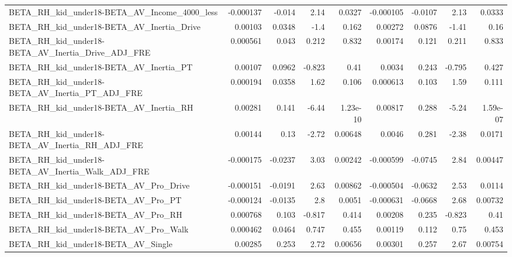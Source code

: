 \begin{tabular}{lrrrrrrrr}
BETA\_RH\_kid\_under18-BETA\_AV\_Income\_4000\_less       &   -0.000137 &       -0.014 &     2.14 &   0.0327 &  -0.000105 &     -0.0107 &         2.13 &        0.0333 \\
BETA\_RH\_kid\_under18-BETA\_AV\_Inertia\_Drive          &     0.00103 &       0.0348 &     -1.4 &    0.162 &    0.00272 &      0.0876 &        -1.41 &          0.16 \\
BETA\_RH\_kid\_under18-BETA\_AV\_Inertia\_Drive\_ADJ\_FRE  &    0.000561 &        0.043 &    0.212 &    0.832 &    0.00174 &       0.121 &        0.211 &         0.833 \\
BETA\_RH\_kid\_under18-BETA\_AV\_Inertia\_PT             &     0.00107 &       0.0962 &   -0.823 &     0.41 &     0.0034 &       0.243 &       -0.795 &         0.427 \\
BETA\_RH\_kid\_under18-BETA\_AV\_Inertia\_PT\_ADJ\_FRE     &    0.000194 &       0.0358 &     1.62 &    0.106 &   0.000613 &       0.103 &         1.59 &         0.111 \\
BETA\_RH\_kid\_under18-BETA\_AV\_Inertia\_RH             &     0.00281 &        0.141 &    -6.44 & 1.23e-10 &    0.00817 &       0.288 &        -5.24 &      1.59e-07 \\
BETA\_RH\_kid\_under18-BETA\_AV\_Inertia\_RH\_ADJ\_FRE     &     0.00144 &         0.13 &    -2.72 &  0.00648 &     0.0046 &       0.281 &        -2.38 &        0.0171 \\
BETA\_RH\_kid\_under18-BETA\_AV\_Inertia\_Walk\_ADJ\_FRE   &   -0.000175 &      -0.0237 &     3.03 &  0.00242 &  -0.000599 &     -0.0745 &         2.84 &       0.00447 \\
BETA\_RH\_kid\_under18-BETA\_AV\_Pro\_Drive              &   -0.000151 &      -0.0191 &     2.63 &  0.00862 &  -0.000504 &     -0.0632 &         2.53 &        0.0114 \\
BETA\_RH\_kid\_under18-BETA\_AV\_Pro\_PT                 &   -0.000124 &      -0.0135 &      2.8 &   0.0051 &  -0.000631 &     -0.0668 &         2.68 &       0.00732 \\
BETA\_RH\_kid\_under18-BETA\_AV\_Pro\_RH                 &    0.000768 &        0.103 &   -0.817 &    0.414 &    0.00208 &       0.235 &       -0.823 &          0.41 \\
BETA\_RH\_kid\_under18-BETA\_AV\_Pro\_Walk               &    0.000462 &       0.0464 &    0.747 &    0.455 &    0.00119 &       0.112 &         0.75 &         0.453 \\
BETA\_RH\_kid\_under18-BETA\_AV\_Single                 &     0.00285 &        0.253 &     2.72 &  0.00656 &    0.00301 &       0.257 &         2.67 &       0.00754 \\

\end{tabular}
